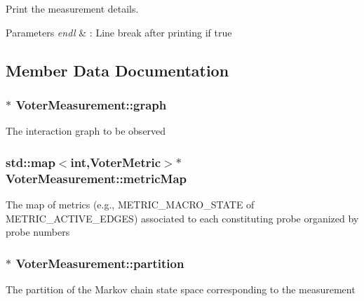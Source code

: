 Print the measurement details. 


\begin{DoxyParams}{Parameters}
{\em endl} & \+: Line break after printing if true \\
\hline
\end{DoxyParams}


\subsection{Member Data Documentation}
\hypertarget{class_voter_measurement_a8d22d4b78f7e2f4c747f5716c4885351}{}
\subsubsection[{graph}]{$\ast$ Voter\+Measurement\+::graph}\label{class_voter_measurement_a8d22d4b78f7e2f4c747f5716c4885351}
The interaction graph to be observed \hypertarget{class_voter_measurement_a27a9133a8ff11810c10c06b647a3ce85}{}
\subsubsection[{metric\+Map}]{\setlength{\rightskip}{0pt plus 5cm}std\+::map$<$int,{\bf Voter\+Metric}$>$$\ast$ Voter\+Measurement\+::metric\+Map}\label{class_voter_measurement_a27a9133a8ff11810c10c06b647a3ce85}
The map of metrics (e.\+g., M\+E\+T\+R\+I\+C\+\_\+\+M\+A\+C\+R\+O\+\_\+\+S\+T\+A\+T\+E of M\+E\+T\+R\+I\+C\+\_\+\+A\+C\+T\+I\+V\+E\+\_\+\+E\+D\+G\+E\+S) associated to each constituting probe organized by probe numbers \hypertarget{class_voter_measurement_aa3879b092c573e4ba4f45531a4f57e5b}{}
\subsubsection[{partition}]{$\ast$ Voter\+Measurement\+::partition}\label{class_voter_measurement_aa3879b092c573e4ba4f45531a4f57e5b}
The partition of the Markov chain state space corresponding to the measurement \hypertarget{class_voter_measurement_abdee5af4a48de3334ace791912033e28}{}
